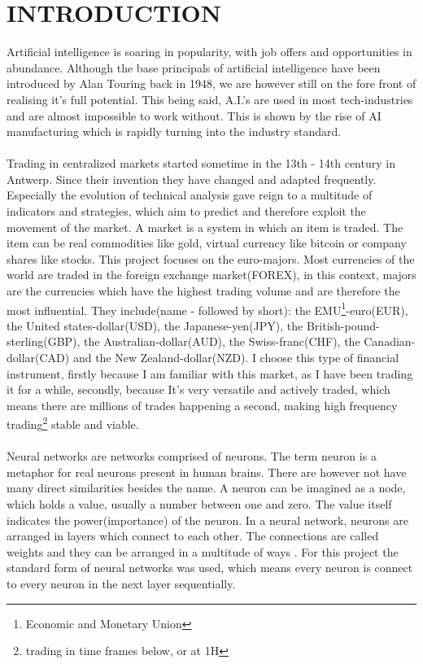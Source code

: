 \documentclass{article}
\begin{document}
\section{INTRODUCTION}
Artificial intelligence is soaring in popularity, with job offers and opportunities in abundance. Although the base principals of artificial intelligence have been introduced by Alan Touring back in 1948\cite{father}, we are however still on the fore front of realising it's full potential. This being said, A.I.'s are used in most tech-industries and are almost impossible to work without. This is shown by the rise of AI manufacturing which is rapidly turning into the industry standard. \\~\\ Trading in centralized markets started sometime in the 13th - 14th century in Antwerp.\cite{finhist} Since their invention they have changed and adapted frequently.\cite{marketevo} Especially the evolution of technical analysis gave reign to a multitude of indicators and strategies, which aim to predict and therefore exploit the movement of the market. A market is a system in which an item is traded. The item can be real commodities like gold, virtual currency like bitcoin or company shares like stocks. This project focuses on the euro-majors. Most currencies of the world are traded in the foreign exchange market(FOREX), in this context, majors are the currencies which have the highest trading volume and are therefore the most influential. They include(name - followed by short): the EMU\footnote{Economic and Monetary Union}-euro(EUR), the United states-dollar(USD), the Japanese-yen(JPY), the British-pound-sterling(GBP), the Australian-dollar(AUD), the Swiss-franc(CHF), the Canadian-dollar(CAD) and the New Zealand-dollar(NZD). I choose this type of financial instrument, firstly because I am familiar with this market, as I have been trading it for a while, secondly, because It's very versatile and actively traded, which means there are millions of trades happening a second, making high frequency trading\footnote{trading in time frames below, or at 1H} stable and viable.\\~\\Neural networks are networks comprised of neurons. The term neuron is a metaphor for real neurons present in human brains. There are however not have many direct similarities besides the name. A neuron can be imagined as a node, which holds a value, usually a number between one and zero. The value itself indicates the power(importance) of the neuron. In a neural network, neurons are arranged in layers which connect to each other. The connections are called weights and they can be arranged in a multitude of ways \cite{structure}. For this project the standard form of neural networks was used, which means every neuron is connect to every neuron in the next layer sequentially.
\end{document}
